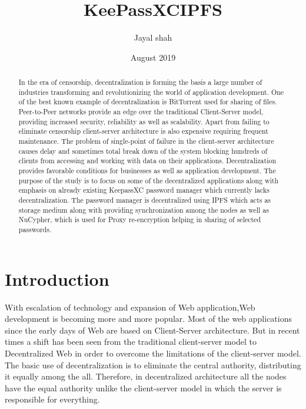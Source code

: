 \documentclass[12pt]{article}
\title{KeePassXCIPFS}
\author{Jayal shah}
\date{August 2019}
\begin{document}
\maketitle

\newpage
\begin{abstract}
    
In the era of censorship, decentralization is forming the basis a large number of industries transforming and revolutionizing the world of application development. One of the best known example of decentralization is BitTorrent used for sharing of files. Peer-to-Peer networks provide an edge over the traditional Client-Server model, providing increased security, reliability as well as scalability. Apart from failing to eliminate censorship client-server architecture is also expensive requiring frequent maintenance. The problem of single-point of failure in the client-server architecture causes delay and sometimes total break down of the system blocking hundreds of clients from accessing and working with data on their applications. Decentralization  provides favorable conditions for businesses as well as application development. The purpose of the study is to focus on some of the decentralized applications along with emphasis on already existing KeepassXC password manager which currently lacks decentralization. The password manager is decentralized using IPFS which acts as storage medium along with providing synchronization among the nodes as well as  NuCypher, which is used for Proxy re-encryption helping in sharing of selected passwords.
\end{abstract}

\newpage
\tableofcontents
\newpage


\section{Introduction}



With escalation of technology and expansion of Web application,Web development is becoming more and more popular. Most of the web applications since the early days of Web are based on Client-Server architecture. But in recent times a shift has been seen from the traditional client-server model to Decentralized Web in order to overcome the limitations of the client-server model. The basic use of decentralization is to eliminate the central authority, distributing it equally among the all. Therefore, in decentralized architecture all the nodes have the equal authority unlike the client-server model in which the server is responsible for everything.
\end{document}
